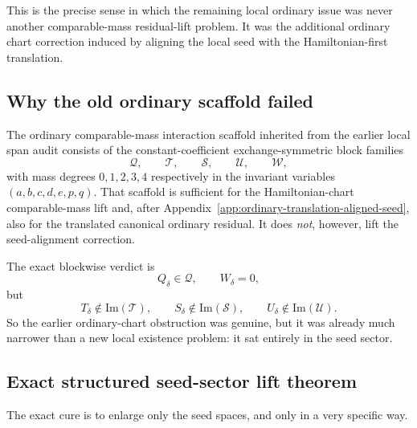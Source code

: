 \documentclass[11pt]{article}
\begin{document}
This is the precise sense in which the remaining local ordinary issue was never
another comparable-mass residual-lift problem.  It was the additional ordinary
chart correction induced by aligning the local seed with the Hamiltonian-first
translation.

\subsection{Why the old ordinary scaffold failed}
\label{app:structured-aligned-seed-old-scaffold-failure}

The ordinary comparable-mass interaction scaffold inherited from the earlier
local span audit consists of the constant-coefficient exchange-symmetric block
families
\begin{equation}
\mathcal Q,
\qquad
\mathcal T,
\qquad
\mathcal S,
\qquad
\mathcal U,
\qquad
\mathcal W,
\label{eq:app-structured-aligned-seed-old-families}
\end{equation}
with mass degrees $0,1,2,3,4$ respectively in the invariant variables
$(a,b,c,d,e,p,q)$.  That scaffold is sufficient for the Hamiltonian-chart
comparable-mass lift and, after Appendix~\ref{app:ordinary-translation-aligned-seed},
also for the translated canonical ordinary residual.  It does \emph{not},
however, lift the seed-alignment correction.

The exact blockwise verdict is
\begin{equation}
Q_\delta\in \mathcal Q,
\qquad
W_\delta=0,
\label{eq:app-structured-aligned-seed-old-success-blocks}
\end{equation}
but
\begin{equation}
T_\delta\notin \mathrm{Im}(\mathcal T),
\qquad
S_\delta\notin \mathrm{Im}(\mathcal S),
\qquad
U_\delta\notin \mathrm{Im}(\mathcal U).
\label{eq:app-structured-aligned-seed-old-failure-blocks}
\end{equation}
So the earlier ordinary-chart obstruction was genuine, but it was already much
narrower than a new local existence problem: it sat entirely in the seed sector.

\subsection{Exact structured seed-sector lift theorem}
\label{app:structured-aligned-seed-lift-theorem}

The exact cure is to enlarge only the seed spaces, and only in a very specific
way.
\end{document}
